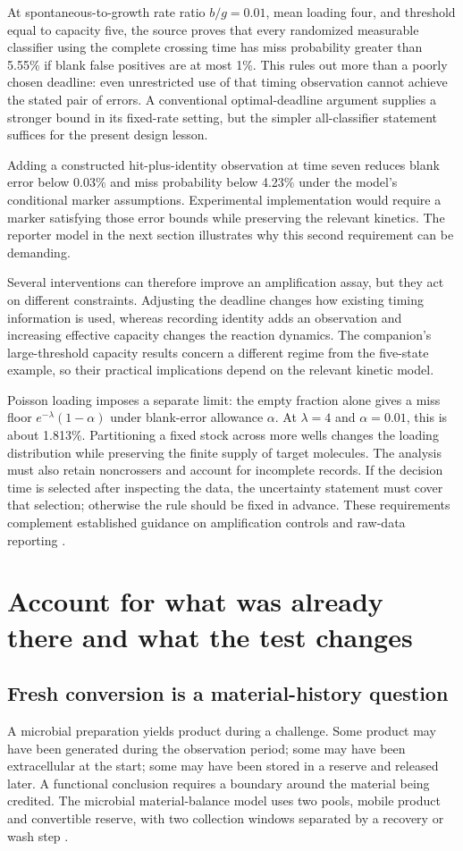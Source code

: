 \documentclass[11pt]{article}
\begin{document}
At spontaneous-to-growth rate ratio $b/g=0.01$, mean loading four, and threshold equal to capacity five, the source proves that every randomized measurable classifier using the complete crossing time has miss probability greater than 5.55\% if blank false positives are at most 1\%. This rules out more than a poorly chosen deadline: even unrestricted use of that timing observation cannot achieve the stated pair of errors. A conventional optimal-deadline argument supplies a stronger bound in its fixed-rate setting, but the simpler all-classifier statement suffices for the present design lesson.

Adding a constructed hit-plus-identity observation at time seven reduces blank error below 0.03\% and miss probability below 4.23\% under the model's conditional marker assumptions. Experimental implementation would require a marker satisfying those error bounds while preserving the relevant kinetics. The reporter model in the next section illustrates why this second requirement can be demanding.

Several interventions can therefore improve an amplification assay, but they act on different constraints. Adjusting the deadline changes how existing timing information is used, whereas recording identity adds an observation and increasing effective capacity changes the reaction dynamics. The companion's large-threshold capacity results concern a different regime from the five-state example, so their practical implications depend on the relevant kinetic model.

Poisson loading imposes a separate limit: the empty fraction alone gives a miss floor $e^{-\lambda}(1-\alpha)$ under blank-error allowance $\alpha$. At $\lambda=4$ and $\alpha=0.01$, this is about 1.813\%. Partitioning a fixed stock across more wells changes the loading distribution while preserving the finite supply of target molecules. The analysis must also retain noncrossers and account for incomplete records. If the decision time is selected after inspecting the data, the uncertainty statement must cover that selection; otherwise the rule should be fixed in advance. These requirements complement established guidance on amplification controls and raw-data reporting \citep{miqe}.

\section{Account for what was already there and what the test changes}
\subsection{Fresh conversion is a material-history question}
A microbial preparation yields product during a challenge. Some product may have been generated during the observation period; some may have been extracellular at the start; some may have been stored in a reserve and released later. A functional conclusion requires a boundary around the material being credited. The microbial material-balance model uses two pools, mobile product and convertible reserve, with two collection windows separated by a recovery or wash step \citep{M}.
\end{document}

